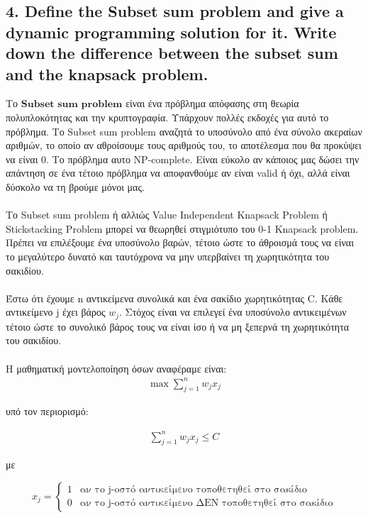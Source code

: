 \documentclass[12pt]{article}
\begin{document}
\pagebreak

\subsection*{4. Define the Subset sum problem and give a dynamic programming solution for
	it. Write down the difference between the subset sum and the knapsack problem.}

Το \(\textbf{Subset sum problem}\) είναι ένα πρόβλημα απόφασης στη θεωρία πολυπλοκότητας και την κρυπτογραφία. Υπάρχουν πολλές εκδοχές για αυτό το πρόβλημα. Το Subset sum problem αναζητά το υποσύνολο από ένα σύνολο ακεραίων αριθμών, το οποίο αν αθροίσουμε τους αριθμούς του, το αποτέλεσμα που θα προκύψει να είναι 0. Το πρόβλημα αυτο NP-complete. Είναι εύκολο αν κάποιος μας δώσει την απάντηση σε ένα τέτοιο πρόβλημα να αποφανθούμε αν είναι valid ή όχι, αλλά είναι δύσκολο να τη βρούμε μόνοι μας. \\ \\

Το Subset sum problem ή αλλιώς Value Independent Knapsack Problem ή Stickstacking Problem μπορεί να θεωρηθεί στιγμιότυπο του 0-1 Knapsack problem. Πρέπει να επιλέξουμε ένα υποσύνολο βαρών, τέτοιο ώστε το άθροισμά τους να είναι το μεγαλύτερο δυνατό και ταυτόχρονα να μην υπερβαίνει τη χωρητικότητα του σακιδίου. \\ \\

Έστω ότι έχουμε n αντικείμενα συνολικά και ένα σακίδιο χωρητικότητας C. Κάθε αντικείμενο j έχει βάρος \(w_{j}\). Στόχος είναι να επιλεγεί ένα υποσύνολο αντικειμένων τέτοιο ώστε το συνολικό βάρος τους να είναι ίσο ή να μη ξεπερνά τη χωρητικότητα του σακιδίου. \\ \\ 

Η μαθηματική μοντελοποίηση όσων αναφέραμε είναι: \\

\begin{align*}
	\max \sum_{j=1}^{n}{w_{j}x_{j}}
\end{align*} 

υπό τον περιορισμό:

\begin{align*}
	\sum_{j=1}^{n}{w_{j}x_{j}} \leq C
\end{align*}

με 

 \[ x_{j} = 
\begin{cases} 
1 & \text{αν το j-οστό αντικείμενο τοποθετηθεί στο σακίδιο} \\
0 & \text{αν το j-οστό αντικείμενο ΔΕΝ τοποθετηθεί στο σακίδιο}
\end{cases}
\]
\end{document}
